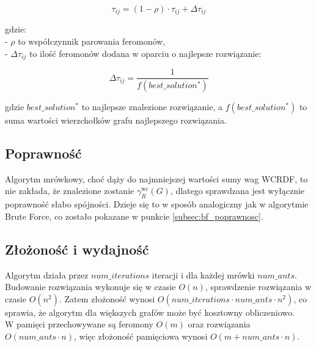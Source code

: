 \[
\tau_{ij} = (1 - \rho) \cdot \tau_{ij} + \Delta \tau_{ij}
\]

gdzie:\\
- \( \rho \) to współczynnik parowania feromonów,\\
- \( \Delta \tau_{ij} \) to ilość feromonów dodana w oparciu o najlepsze rozwiązanie:

\[
\Delta \tau_{ij} = \frac{1}{f(best\_solution^*)}
\]

gdzie \( best\_solution^* \) to najlepsze znalezione rozwiązanie, a \( f(best\_solution^*) \) to suma wartości wierzchołków grafu najlepszego rozwiązania.

\subsection{Poprawność}
Algorytm mrówkowy, choć dąży do najmniejszej wartości sumy wag WCRDF, to nie zakłada, że znalezione zostanie $\gamma^{\text{wc}}_R(G)$, dlatego sprawdzana jest wyłącznie poprawność słabo spójności. Dzieje się to w sposób analogiczny jak w algorytmie Brute Force, co zostało pokazane w punkcie \ref{subsec:bf_poprawnosc}.

\subsection{Złożoność i wydajność}

Algorytm działa przez $num\_iterations$ iteracji i dla każdej mrówki $num\_ants$. Budowanie rozwiązania wykonuje się w czasie $O(n)$, sprawdzenie rozwiązania w czasie $O(n^2)$.
Zatem złożoność wynosi $O(num\_iterations \cdot num\_ants \cdot n^2)$, co sprawia, że algorytm dla większych grafów może być kosztowny obliczeniowo.\\
W pamięci przechowywane są feromony $O(m)$ oraz rozwiązania $O(num\_ants \cdot n)$, więc
złożoność pamięciowa wynosi $O(m+num\_ants \cdot n)$.

